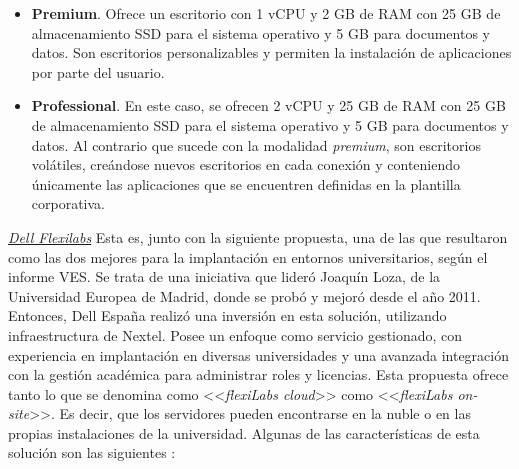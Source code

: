 \begin{itemize}
    \item \textbf{Premium}. Ofrece un escritorio con 1 v\acs{CPU} y 2 \acs{GB} de \acs{RAM} con 25 \acs{GB} de almacenamiento \acs{SSD} para el sistema operativo y 5 \acs{GB} para documentos y datos. Son escritorios personalizables y permiten la instalación de aplicaciones por parte del usuario.
    
    \item \textbf{Professional}. En este caso, se ofrecen 2 v\acs{CPU} y 25 \acs{GB} de \acs{RAM} con 25 \acs{GB} de almacenamiento \acs{SSD} para el sistema operativo y 5 \acs{GB} para documentos y datos. Al contrario que sucede con la modalidad \textit{premium}, son escritorios volátiles, creándose nuevos escritorios en cada conexión y conteniendo únicamente las aplicaciones que se encuentren definidas en la plantilla corporativa.
\end{itemize}

\clearpage

\noindent\underline{\textit{Dell Flexilabs}}\newline
\indent Esta es, junto con la siguiente propuesta, una de las que resultaron como las dos mejores para la implantación en entornos universitarios, según el informe \acs{VES}. Se trata de una iniciativa que lideró Joaquín Loza, de la Universidad Europea de Madrid, donde se probó y mejoró desde el año 2011. Entonces, Dell España realizó una inversión en esta solución, utilizando infraestructura de Nextel. Posee un enfoque como servicio gestionado, con experiencia en implantación en diversas universidades y una avanzada integración con la gestión académica para administrar roles y licencias. Esta propuesta ofrece tanto lo que se denomina como <<\textit{flexiLabs cloud}>> como <<\textit{flexiLabs on-site}>>. Es decir, que los servidores pueden encontrarse en la nuble o en las propias instalaciones de la universidad. Algunas de las características de esta solución son las siguientes \cite{flexilabs}:

